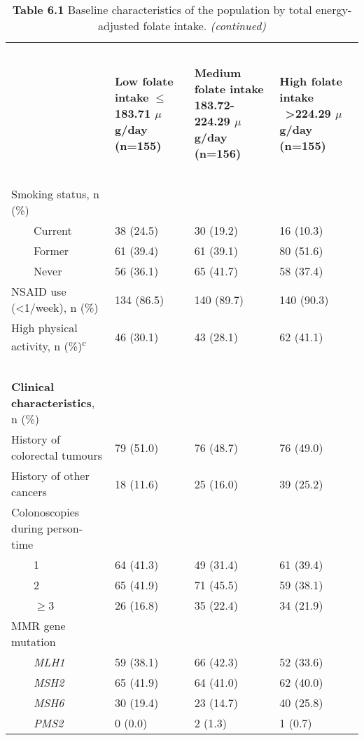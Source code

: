 \begin{table}
\caption*{\textbf{Table 6.1} Baseline characteristics of the population by total energy-adjusted folate intake. \emph{(continued)}}
\begin{adjustbox}{width=\textwidth}
\begin{tabular}{L{4.8cm}C{3.5cm}C{3.5cm}C{3.5cm}}
\hline
~ & ~ & ~ & ~\\
~ & {\bfseries Low folate intake} {\bfseries ${\leq}$183.71 $\mu$g/day} \bfseries (n=155) & {\bfseries Medium folate intake} \bfseries 183.72-224.29 $\mu$g/day (n=156) & {\bfseries High folate intake} \ {\bfseries {\textgreater}224.29 $\mu$g/day} \bfseries (n=155)\\
~ & ~ & ~ & ~\\
\hline
 Smoking status, n (\%) & ~ & ~ & ~ \\
 \ \ \ \ Current & 38 (24.5) & 30 (19.2) & 16 (10.3)\\
 \ \ \ \ Former & 61 (39.4) & 61 (39.1) & 80 (51.6)\\
 \ \ \ \ Never & 56 (36.1) & 65 (41.7) & 58 (37.4)\\
 NSAID use ({\textless}1/week), n (\%) & 134 (86.5) & 140 (89.7) & 140 (90.3)\\
{High physical activity, n (\%)}{\textsuperscript{c}} & 46 (30.1) & 43 (28.1) & 62 (41.1)\\
~ & ~ & ~ & ~\\
{\textbf{Clinical characteristics}}{, n (\%)} & ~ & ~ & ~ \\
{History of colorectal tumours} & 79 (51.0) & 76 (48.7) & 76 (49.0)\\
 History of other cancers & 18 (11.6) & 25 (16.0) & 39 (25.2)\\
 Colonoscopies during person-time & ~ & ~ & ~ \\
 \ \ \ \ 1 & 64 (41.3) & 49 (31.4) & 61 (39.4)\\
 \ \ \ \ 2 & 65 (41.9) & 71 (45.5) & 59 (38.1)\\
 \ \ \ \ ${\geq}$3 & 26 (16.8) & 35 (22.4) & {34 (21.9)}\\
 MMR gene mutation & ~ & ~ & ~ \\
 \ \ \ \ \emph{MLH1} & 59 (38.1) & 66 (42.3) & 52 (33.6)\\
 \ \ \ \ \emph{MSH2} \ \ & 65 (41.9) & 64 (41.0) & 62 (40.0)\\
 \ \ \ \ \emph{MSH6} & 30 (19.4) & 23 (14.7) & 40 (25.8)\\
 \ \ \ \ \emph{PMS2} & 0 (0.0) & 2 (1.3) & 1 (0.7)\\

\end{tabular}
\end{adjustbox}
\end{table}
